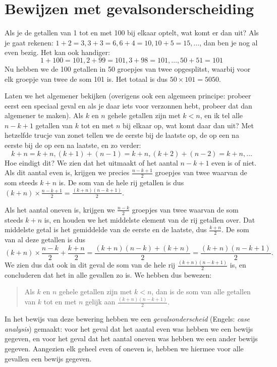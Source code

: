 \section{Bewijzen met gevalsonderscheiding}
Als je de getallen van 1 tot en met 100 bij elkaar optelt, wat komt er dan uit? Als je gaat rekenen: $1+2=3,3+3=6,6+4=10,10+5=15,\ldots$, dan ben je nog al even bezig. Het kan ook handiger:
$$1+100=101,2+99=101,3+98=101,\ldots,50+51=101$$
Nu hebben we de 100 getallen in 50 groepjes van twee opgesplitst, waarbij voor elk groepje van twee de som 101 is. Het totaal is dus $50\times 101=5050$.

Laten we het algemener bekijken (overigens ook een algemeen principe: probeer eerst een speciaal geval en als je daar iets voor verzonnen hebt, probeer dat dan algemener te maken). Als $k$ en $n$ gehele getallen zijn met $k<n$, en ik tel alle $n-k+1$ getallen van $k$ tot en met $n$ bij elkaar op, wat komt daar dan uit? Met hetzelfde trucje van zonet tellen we de eerste bij de laatste op, de op een na eerste bij de op een na laatste, en zo verder:
$$k+n=k+n,(k+1)+(n-1)=k+n,(k+2)+(n-2)=k+n,\ldots$$
Hoe eindigt dit? We zien dat het uitmaakt of het aantal $n-k+1$ even is of niet. Als dit aantal even is, krijgen we precies $\frac{n-k+1}{2}$ groepjes van twee waarvan de som steeds $k+n$ is. De som van de hele rij getallen is dus $(k+n)\times\frac{n-k+1}{2}=\frac{(k+n)(n-k+1)}{2}$.

Als het aantal oneven is, krijgen we $\frac{n-k}{2}$ groepjes van twee waarvan de som steeds $k+n$ is, en houden we het middelste element van de rij getallen over. Dat middelste getal is het gemiddelde van de eerste en de laatste, dus $\frac{k+n}{2}$. De som van al deze getallen is dus 
$$(k+n)\times\frac{n-k}{2}+\frac{k+n}{2}=\frac{(k+n)(n-k)+(k+n)}{2}=\frac{(k+n)(n-k+1)}{2}.$$
We zien dus dat ook in dit geval de som van de hele rij $\frac{(k+n)(n-k+1)}{2}$ is, en concluderen dat het in alle gevallen zo is. We hebben dus bewezen:
\begin{quote}
    Als $k$ en $n$ gehele getallen zijn met $k<n$, dan is de som van alle getallen van $k$ tot en met $n$ gelijk aan $\frac{(k+n)(n-k+1)}{2}$.
\end{quote}
In het bewijs van deze bewering hebben we een \textit{gevalsonderscheid} (Engels: \textit{case analysis}) gemaakt: voor het geval dat het aantal even was hebben we een bewijs gegeven, en voor het geval dat het aantal oneven was hebben we een ander bewijs gegeven. Aangezien elk geheel even of oneven is, hebben we hiermee voor alle gevallen een bewijs gegeven.

